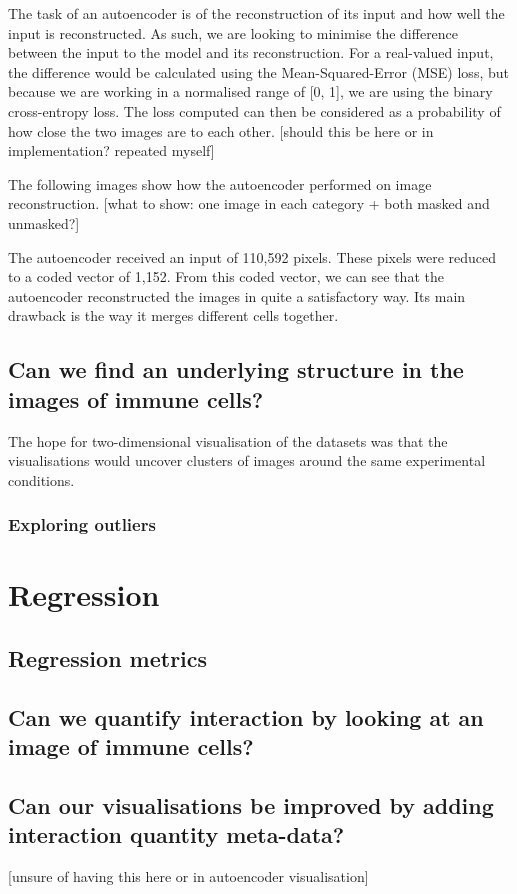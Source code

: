 The task of an autoencoder is of the reconstruction of its input and how well the input is reconstructed. As such, we are looking to minimise the difference between the input to the model and its reconstruction. For a real-valued input, the difference would be calculated using the Mean-Squared-Error (MSE) loss, but because we are working in a normalised range of [0, 1], we are using the binary cross-entropy loss. The loss computed can then be considered as a probability of how close the two images are to each other. [should this be here or in implementation? repeated myself]

The following images show how the autoencoder performed on image reconstruction. [what to show: one image in each category + both masked and unmasked?]

The autoencoder received an input of 110,592 pixels. These pixels were reduced to a coded vector of 1,152. From this coded vector, we can see that the autoencoder reconstructed the images in quite a satisfactory way. Its main drawback is the way it merges different cells together.

\subsection{Can we find an underlying structure in the images of immune cells?}

The hope for two-dimensional visualisation of the datasets was that the visualisations would uncover clusters of images around the same experimental conditions.

\bigskip
\subsubsection{Exploring outliers}

\section{Regression}

\subsection{Regression metrics}

\subsection{Can we quantify interaction by looking at an image of immune cells?}

\subsection{Can our visualisations be improved by adding interaction quantity meta-data?}

[unsure of having this here or in autoencoder visualisation]
